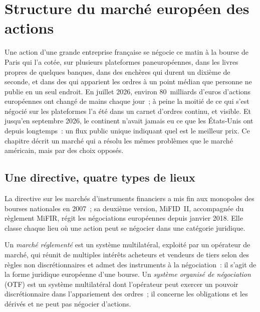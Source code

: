 \chapter{Structure du marché européen des actions}\label{ch:m1:european-equity-market-structure}

Une action d'une grande entreprise française se négocie ce matin à la bourse de Paris qui l'a cotée,
sur plusieurs plateformes paneuropéennes, dans les livres propres de quelques
banques, dans des enchères qui durent un dixième
de seconde, et dans des  qui apparient les ordres à un point médian que personne ne publie
en un seul endroit. En juillet 2026, environ 80~milliards d'euros d'actions européennes ont changé de mains
chaque jour~; à peine la moitié de ce qui s'est négocié sur les plateformes l'a été dans un carnet d'ordres continu,
et visible. Et jusqu'en septembre 2026, le continent n'avait jamais eu ce
que les États-Unis ont depuis longtemps~: un flux public unique indiquant quel est le meilleur
prix. Ce chapitre décrit un marché qui a résolu les mêmes
problèmes que le marché américain, mais par des choix opposés.

\section{Une directive, quatre types de lieux}

La directive sur les marchés d'instruments financiers a mis fin aux
monopoles des bourses nationales en 2007~; sa deuxième version, MiFID~II, accompagnée du règlement
MiFIR, régit les négociations européennes depuis janvier 2018. Elle classe
chaque lieu où une action peut se négocier dans une catégorie juridique.

\begin{definition}\label{def:m1:european-equity-market-structure:rm}
Un \emph{marché réglementé} est un système multilatéral,
exploité par un opérateur de marché, qui réunit de multiples intérêts acheteurs et vendeurs de tiers
selon des règles non discrétionnaires et admet des instruments à la négociation~: il s'agit de la forme
juridique européenne d'une bourse. Un
\emph{système organisé de négociation} (OTF) est un système multilatéral
dont l'opérateur peut exercer un pouvoir discrétionnaire dans l'appariement des ordres~; il
concerne les obligations et les dérivés et ne peut pas négocier d'actions.
\end{definition}

